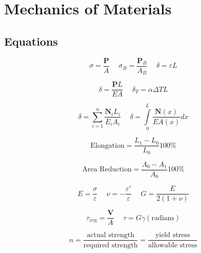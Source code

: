 \documentclass[twocolumn, 12pt]{article}
\begin{document}
\small{



\section*{Mechanics of Materials}
\subsection*{Equations}

\begin{equation*}
     \sigma=\frac{ \textbf{P}}{A} \hspace{15pt} \sigma_B=\frac{\textbf{P}_B}{A_B} \hspace{15pt} \delta=\varepsilon L
\end{equation*}


\begin{equation*}
     \delta=\frac{\textbf{P}L}{EA} \hspace{15pt} \delta_T=\alpha\Delta TL
\end{equation*}

\begin{equation*}
    \delta=\sum_{i=1}^{n} \frac{\textbf{N}_iL_i}{E_iA_i} \hspace{15pt} \delta=\int\limits_0^L \frac{\textbf{N}(x)}{EA(x)}dx
\end{equation*}

\begin{equation*}
    \text{Elongation}=\frac{L_1-L_0}{L_0}100\%  
\end{equation*}

\begin{equation*}
    \text{Area} \text{ Reduction}=\frac{A_0-A_1}{A_0}100\%
\end{equation*}

\begin{equation*}
     E=\frac{\sigma}{\varepsilon} \hspace{15pt }\nu=-\frac{\varepsilon'}{\varepsilon} \hspace{15pt} G=\frac{E}{2(1+\nu)}
\end{equation*}

\begin{equation*}
     \tau_{\text{avg}}=\frac{\textbf{V}}{A} \hspace{15pt}  \tau=G\gamma(\text{radians})
\end{equation*}

\begin{equation*}
     \textit{n}=\frac{\text{actual strength} }{\text{required strength}}=\frac{\text{yield stress}}{\text{allowable stress}}
\end{equation*}

}
\end{document}
